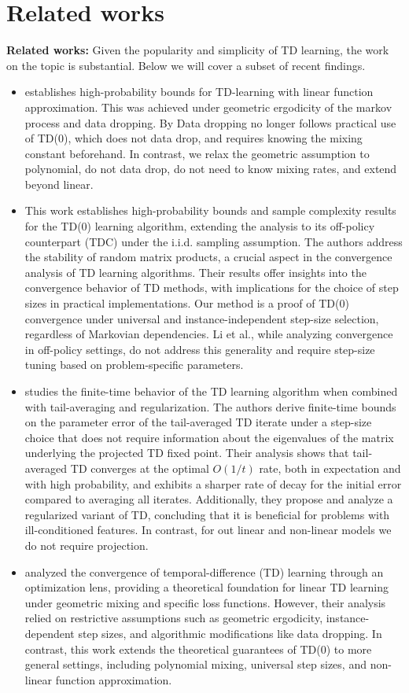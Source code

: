 \section{Related works}
\textbf{Related works:} Given the popularity and simplicity of TD learning, the work on the topic is substantial. Below we will cover a subset of recent findings.
\begin{itemize}
    \item \cite{samsonov24} establishes high-probability bounds for TD-learning with linear function approximation. This was achieved under geometric ergodicity of the markov process and data dropping. By Data dropping \cite{samsonov24} no longer follows practical use of TD(0), which does not data drop, and requires knowing the mixing constant beforehand. In contrast, we relax the geometric assumption to polynomial, do not data drop, do not need to know mixing rates, and extend beyond linear.
    \item \cite{li2024high} This work establishes high-probability bounds and sample complexity results for the TD(0) learning algorithm, extending the analysis to its off-policy counterpart (TDC) under the i.i.d. sampling assumption. The authors address the stability of random matrix products, a crucial aspect in the convergence analysis of TD learning algorithms. Their results offer insights into the convergence behavior of TD methods, with implications for the choice of step sizes in practical implementations. Our method is a proof of TD(0) convergence under universal and instance-independent step-size selection, regardless of Markovian dependencies. Li et al., while analyzing convergence in off-policy settings, do not address this generality and require step-size tuning based on problem-specific parameters.
    \item \cite{patil2023finite} studies the finite-time behavior of the TD learning algorithm when combined with tail-averaging and regularization. The authors derive finite-time bounds on the parameter error of the tail-averaged TD iterate under a step-size choice that does not require information about the eigenvalues of the matrix underlying the projected TD fixed point. Their analysis shows that tail-averaged TD converges at the optimal \(O(1/t)\) rate, both in expectation and with high probability, and exhibits a sharper rate of decay for the initial error compared to averaging all iterates. Additionally, they propose and analyze a regularized variant of TD, concluding that it is beneficial for problems with ill-conditioned features. In contrast, for out linear and non-linear models we do not require projection.
    \item \cite{asadi2024td} analyzed the convergence of temporal-difference (TD) learning through an optimization lens, providing a theoretical foundation for linear TD learning under geometric mixing and specific loss functions. However, their analysis relied on restrictive assumptions such as geometric ergodicity, instance-dependent step sizes, and algorithmic modifications like data dropping. In contrast, this work extends the theoretical guarantees of TD(0) to more general settings, including polynomial mixing, universal step sizes, and non-linear function approximation.
\end{itemize}
